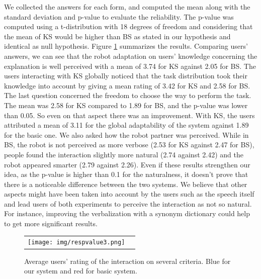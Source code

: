 We collected the answers for each form, and computed the mean along with the standard deviation and p-value to evaluate the reliability. The p-value was computed using a t-distribution with 18 degrees of freedom and considering that the mean of KS would be higher than BS as stated in our hypothesis and identical as null hypothesis. 
Figure \ref{fig:results} summarizes the results. Comparing users' answers, we can see that the robot adaptation on users' knowledge concerning the explanation is well perceived with a mean of 3.74 for KS against 2.05 for BS. The users interacting with KS globally noticed that the task distribution took their knowledge into account by giving a mean rating of 3.42 for KS and 2.58 for BS. The last question concerned the freedom to choose the way to perform the task. The mean was 2.58 for KS compared to 1.89 for BS, and the p-value was lower than 0.05. So even on that aspect there was an improvement. 
With KS, the users attributed a mean of 3.11 for the global adaptability of the system against 1.89 for the basic one.
We also asked how the robot partner was perceived. While in BS, the robot is not perceived as more verbose (2.53 for KS against 2.47 for BS), people found the interaction slightly more natural (2.74 against 2.42) and the robot appeared smarter (2.79 against 2.26). Even if these results strengthen our idea, as the p-value is higher than 0.1 for the naturalness, it doesn't prove that there is a noticeable difference between the two systems. We believe that other aspects might have been taken into account by the users such as the speech itself and lead users of both experiments to perceive the interaction as not so natural. For instance, improving the verbalization with a synonym dictionary could help to get more significant results.



 \begin{figure}[ht!]

   \vspace{-9pt}
 \centering
 \begin{tabular}{cc}
  \texttt{[image: img/respvalue3.png]}
 \end{tabular}
   \vspace{-8pt}
 \caption{Average users' rating of the interaction on several criteria. Blue for our system and red for basic system.}
 \label{fig:results}
  \vspace{-10pt}
 \end{figure}


